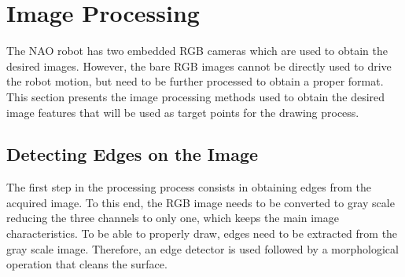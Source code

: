 \documentclass[conference]{IEEEtran}
\begin{document}
\section{Image Processing}
\label{sec:methodology}

The NAO robot has two embedded RGB cameras which are used to obtain the desired images. However, the bare RGB images cannot be directly used to drive the robot motion, but need to be further processed to obtain a proper format. This section presents the image processing methods used to obtain the desired image features that will be used as target points for the drawing process.

\subsection{Detecting Edges on the Image}

The first step in the processing process consists in obtaining edges from the acquired image. To this end, the RGB image needs to be converted to gray scale reducing the three channels to only one, which keeps the main image characteristics. To be able to properly draw, edges need to be extracted from the gray scale image. Therefore, an edge detector is used followed by a morphological operation that cleans the surface.
\end{document}
